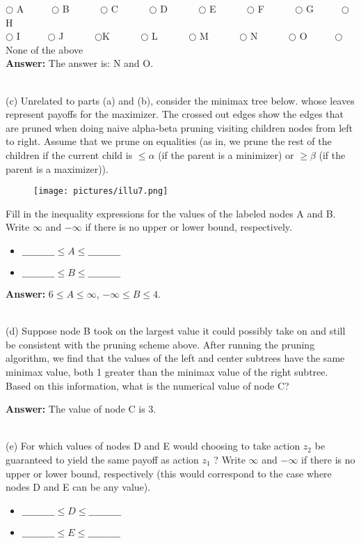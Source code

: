 \documentclass{article}
\begin{document}
\indent $\bigcirc$ A  ~~~~~$\bigcirc$ B  ~~~~~ $\bigcirc$ C  ~~~~~ $\bigcirc$ D  ~~~~~ $\bigcirc$ E ~~~~~ $\bigcirc$ F  ~~~~~  $\bigcirc$ G   ~~~~~$\bigcirc$ H\\
\indent $\bigcirc$ I  ~~~~~$\bigcirc$ J  ~~~~~ $\bigcirc$K  ~~~~~ $\bigcirc$ L ~~~~~ $\bigcirc$ M ~~~~~ $\bigcirc$ N  ~~~~~  $\bigcirc$ O   ~~~~~$\bigcirc$ None of the above\\

\textbf{Answer:} The answer is: N and O.


~\\

\noindent (c) Unrelated to parts (a) and (b), consider the minimax tree below. whose leaves represent payoffs for the maximizer. The crossed out edges show the edges that are pruned when doing naive alpha-beta pruning visiting children nodes from left to right. Assume that we prune on equalities (as in, we prune the rest of the children if the current child is $\le \alpha$ (if the parent is a minimizer) or $\ge \beta$ (if the parent is a maximizer)).
\begin{figure}[h]
\centering
\texttt{[image: pictures/illu7.png]}
\end{figure}
Fill in the inequality expressions for the values of the labeled nodes A and B. Write $\infty$ and $-\infty$ if there is no upper or lower bound, respectively.
\begin{itemize}
  \item  $\_\_\_\_\_\_\_\_\_\_ \le A \le \_\_\_\_\_\_\_\_\_\_$
  \item  $\_\_\_\_\_\_\_\_\_\_ \le B \le \_\_\_\_\_\_\_\_\_\_$
\end{itemize}

\textbf{Answer:} $6 \leq A \leq \infty$, $-\infty \leq B \leq 4$.

~\\

\noindent (d) Suppose node B took on the largest value it could possibly take on and still be consistent with the pruning scheme above. After running the pruning algorithm, we find that the values of the left and center subtrees have the same minimax value, both 1 greater than the minimax value of the right subtree. Based on this information, what is the numerical value of node C?  

\textbf{Answer:} The value of node C is 3.

~\\

\noindent (e) For which values of nodes D and E would choosing to take action $z_2$ be guaranteed to yield the same payoff as action $z_1$ ? Write $\infty$ and $-\infty$ if there is no upper or lower bound, respectively (this would correspond to the case where nodes D and E can be any value).
\begin{itemize}
  \item  $\_\_\_\_\_\_\_\_\_\_ \le D \le \_\_\_\_\_\_\_\_\_\_$
  \item  $\_\_\_\_\_\_\_\_\_\_ \le E \le \_\_\_\_\_\_\_\_\_\_$
\end{itemize}
\end{document}
